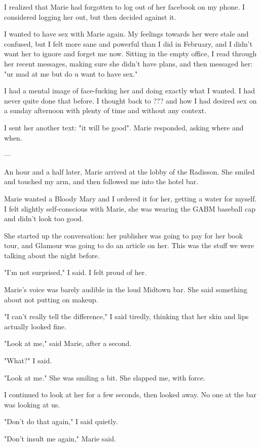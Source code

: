 \documentclass[12pt]{article}
\begin{document}
I realized that Marie had forgotten to log out of her facebook on my phone.  I
considered logging her out, but then decided against it.

I wanted to have sex with Marie again.  My feelings towards her were stale and
confused, but I felt more sane and powerful than I did in February, and I didn't
want her to ignore and forget me now.  Sitting in the empty office, I read
through her recent messages, making sure she didn't have plans, and then
messaged her: "ur mad at me but do u want to have sex."

I had a mental image of face-fucking her and doing exactly what I wanted.  I had
never quite done that before.  I thought back to ??? and how I had desired sex
on a sunday afternoon with plenty of time and without any context.  

I sent her another text: "it will be good".  Marie responded, asking where and
when.

---

An hour and a half later, Marie arrived at the lobby of the Radisson.  She
smiled and touched my arm, and then followed me into the hotel bar.  

Marie wanted a Bloody Mary and I ordered it for her, getting a water for myself.
I felt slightly self-conscious with Marie, she was wearing the GABM baseball cap
and didn't look too good.

She started up the conversation: her publisher was going to pay for her book
tour, and Glamour was going to do an article on her.  This was the stuff we were
talking about the night before.  

"I'm not surprised," I said.  I felt proud of her.

Marie's voice was barely audible in the loud Midtown bar.  She said something
about not putting on makeup.

"I can't really tell the difference," I said tiredly, thinking that her skin and
lips actually looked fine.

"Look at me," said Marie, after a second.

"What?" I said.

"Look at me."  She was smiling a bit.  She slapped me, with force.

I continued to look at her for a few seconds, then looked away.  No one at the
bar was looking at us.

"Don't do that again," I said quietly.

"Don't insult me again," Marie said.
\end{document}
